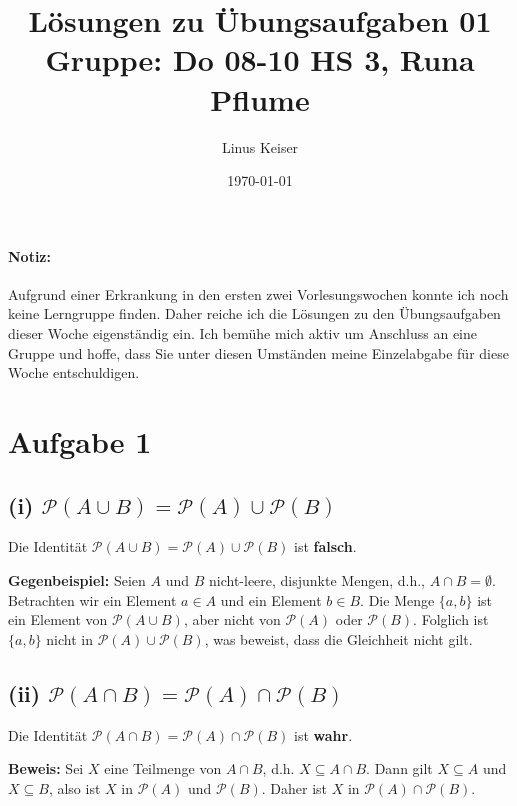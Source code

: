 \documentclass[12pt]{article}
\title{Lösungen zu Übungsaufgaben 01 \\ \small Gruppe: Do 08-10 HS 3, Runa Pflume}
\author{Linus Keiser}
\date{\today}
\begin{document}
\maketitle

\paragraph{Notiz:} Aufgrund einer Erkrankung in den ersten zwei Vorlesungswochen konnte ich noch keine Lerngruppe finden. Daher reiche ich die Lösungen zu den Übungsaufgaben dieser Woche eigenständig ein. Ich bemühe mich aktiv um Anschluss an eine Gruppe und hoffe, dass Sie unter diesen Umständen meine Einzelabgabe für diese Woche entschuldigen.
\section*{Aufgabe 1}

\subsection*{(i) \( \mathcal{P}(A \cup B) = \mathcal{P}(A) \cup \mathcal{P}(B) \)}

Die Identität \( \mathcal{P}(A \cup B) = \mathcal{P}(A) \cup \mathcal{P}(B) \) ist \textbf{falsch}.

\textbf{Gegenbeispiel:}
Seien \( A \) und \( B \) nicht-leere, disjunkte Mengen, d.h., \( A \cap B = \emptyset \).
Betrachten wir ein Element \( a \in A \) und ein Element \( b \in B \).
Die Menge \( \{a, b\} \) ist ein Element von \( \mathcal{P}(A \cup B) \), aber nicht von \( \mathcal{P}(A) \) oder \( \mathcal{P}(B) \).
Folglich ist \( \{a, b\} \) nicht in \( \mathcal{P}(A) \cup \mathcal{P}(B) \), was beweist, dass die Gleichheit nicht gilt.

\subsection*{(ii) \( \mathcal{P}(A \cap B) = \mathcal{P}(A) \cap \mathcal{P}(B) \)}

Die Identität \( \mathcal{P}(A \cap B) = \mathcal{P}(A) \cap \mathcal{P}(B) \) ist \textbf{wahr}.

\textbf{Beweis:}
Sei \( X \) eine Teilmenge von \( A \cap B \), d.h. \( X \subseteq A \cap B \).
Dann gilt \( X \subseteq A \) und \( X \subseteq B \), also ist \( X \) in \( \mathcal{P}(A) \) und \( \mathcal{P}(B) \).
Daher ist \( X \) in \( \mathcal{P}(A) \cap \mathcal{P}(B) \).
\end{document}
